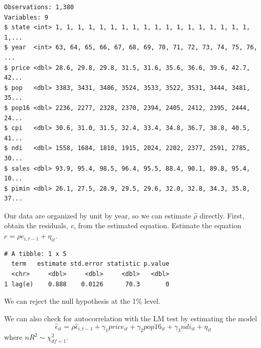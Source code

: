\documentclass[]{book}
\newenvironment{Shaded}{\begin{snugshade}}{\end{snugshade}}
\newcommand{\CommentTok}[1]{\textcolor[rgb]{0.56,0.35,0.01}{\textit{#1}}}
\newcommand{\DecValTok}[1]{\textcolor[rgb]{0.00,0.00,0.81}{#1}}
\newcommand{\KeywordTok}[1]{\textcolor[rgb]{0.13,0.29,0.53}{\textbf{#1}}}
\newcommand{\NormalTok}[1]{#1}
\newcommand{\OperatorTok}[1]{\textcolor[rgb]{0.81,0.36,0.00}{\textbf{#1}}}
\newcommand{\StringTok}[1]{\textcolor[rgb]{0.31,0.60,0.02}{#1}}
\begin{document}
\begin{verbatim}
Observations: 1,380
Variables: 9
$ state <int> 1, 1, 1, 1, 1, 1, 1, 1, 1, 1, 1, 1, 1, 1, 1, 1, 1, 1, 1,...
$ year  <int> 63, 64, 65, 66, 67, 68, 69, 70, 71, 72, 73, 74, 75, 76, ...
$ price <dbl> 28.6, 29.8, 29.8, 31.5, 31.6, 35.6, 36.6, 39.6, 42.7, 42...
$ pop   <dbl> 3383, 3431, 3486, 3524, 3533, 3522, 3531, 3444, 3481, 35...
$ pop16 <dbl> 2236, 2277, 2328, 2370, 2394, 2405, 2412, 2395, 2444, 24...
$ cpi   <dbl> 30.6, 31.0, 31.5, 32.4, 33.4, 34.8, 36.7, 38.8, 40.5, 41...
$ ndi   <dbl> 1558, 1684, 1810, 1915, 2024, 2202, 2377, 2591, 2785, 30...
$ sales <dbl> 93.9, 95.4, 98.5, 96.4, 95.5, 88.4, 90.1, 89.8, 95.4, 10...
$ pimin <dbl> 26.1, 27.5, 28.9, 29.5, 29.6, 32.0, 32.8, 34.3, 35.8, 37...
\end{verbatim}

Our data are organized by unit by year, so we can estimate \(\hat\rho\) directly. First, obtain the residuals, \emph{e}, from the estimated equation. Estimate the equation \(e=\rho e_{i,t-1}+\eta_{it}\).

\begin{Shaded}
\end{Shaded}

\begin{verbatim}
# A tibble: 1 x 5
  term   estimate std.error statistic p.value
  <chr>     <dbl>     <dbl>     <dbl>   <dbl>
1 lag(e)    0.888    0.0126      70.3       0
\end{verbatim}

We can reject the null hypothesis at the 1\% level.

We can also check for autocorrelation with the LM test by estimating the model \[\hat\epsilon_{it}=\rho\hat\epsilon_{i,t-1}+\gamma_1price_{it}+\gamma_2pop16_{it}+\gamma_3ndi_{it}+\eta_{it}\] where \(nR^2\sim\chi^2_{df=1}\).
\end{document}

